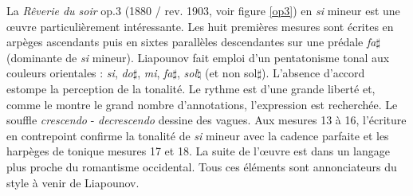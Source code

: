 \newpage

La \emph{Rêverie du soir} op.3 (1880 / rev. 1903, voir figure \ref{op3}) en \emph{si} mineur est une œuvre particulièrement intéressante. Les huit premières mesures sont écrites en arpèges ascendants puis en sixtes parallèles descendantes sur une prédale \emph{fa}$\sharp$ (dominante de \emph{si} mineur). Liapounov fait emploi d'un pentatonisme tonal aux couleurs orientales : \emph{si}, \emph{do}$\sharp$, \emph{mi}, \emph{fa}$\sharp$, \emph{sol}$\natural$ (et non sol$\sharp$). L'absence d'accord estompe la perception de la tonalité. Le rythme est d'une grande liberté et, comme le montre le grand nombre d'annotations, l'expression est recherchée. Le souffle \emph{crescendo} - \emph{decrescendo} dessine des vagues. Aux mesures 13 à 16, l'écriture en contrepoint confirme la tonalité de \emph{si} mineur avec la cadence parfaite et les harpèges de tonique mesures 17 et 18. La suite de l'œuvre est dans un langage plus proche du romantisme occidental. Tous ces éléments sont annonciateurs du style à venir de Liapounov.

